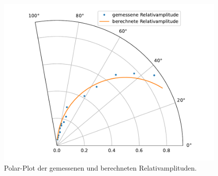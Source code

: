 \begin{figure}
    \centering
    \includegraphics[width=\textwidth]{build/plt/3_polar.pdf}
    \caption{Polar-Plot der gemessenen und berechneten Relativamplituden.}
    \label{fig:3_polar}
\end{figure}
